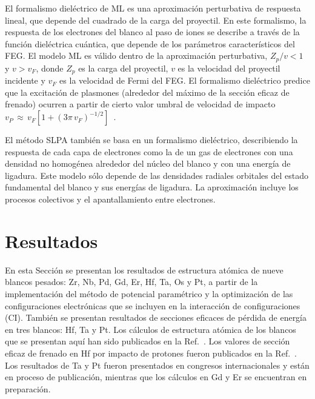 El formalismo dieléctrico de ML es una aproximación perturbativa de 
respuesta lineal, que depende del cuadrado de la carga del proyectil. En 
este formalismo, la respuesta de los electrones del blanco al paso de 
iones se describe a través de la función dieléctrica cuántica, que 
depende de los parámetros característicos del FEG. El modelo ML es 
válido dentro de la aproximación perturbativa, $Z_p/v<1$ y $v>v_F$, 
donde $Z_p$ es la carga del proyectil, $v$ es la velocidad del proyectil
incidente y $v_F$ es la velocidad de Fermi del FEG. El formalismo 
dieléctrico predice que la excitación de plasmones (alrededor del máximo 
de la sección eficaz de frenado) ocurren a partir de cierto valor umbral 
de velocidad de impacto 
$v_P\,\approx\,v_F[1+(3\pi\,v_F)^{-1/2}]$~\cite{suppression}. 

El método SLPA también se basa en un formalismo dieléctrico, 
describiendo la respuesta de cada capa de electrones como la de un gas 
de electrones con una densidad no homogénea alrededor del núcleo del 
blanco y con una energía de ligadura. Este modelo 
sólo depende de las densidades radiales orbitales del estado fundamental 
del blanco y sus energías de ligadura. La aproximación incluye los 
procesos colectivos y el apantallamiento entre electrones. 

\section{Resultados}
\label{sec:results-heavy}

En esta Sección se presentan los resultados de estructura atómica de 
nueve blancos pesados: Zr, Nb, Pd, Gd, Er, Hf, Ta, Os y Pt, a 
partir de la implementación del método de potencial paramétrico y la
optimización de las configuraciones electrónicas que se incluyen en la 
interacción de configuraciones (CI).
También se presentan resultados de secciones eficaces de pérdida de 
energía en tres blancos: Hf, Ta y Pt. Los cálculos de estructura atómica 
de los blancos que se presentan aquí han sido publicados en la 
Ref.~\cite{Mendez:19relat}. Los valores de sección eficaz de frenado en 
Hf por impacto de protones fueron publicados en la 
Ref.~\cite{Montanari:20}. Los resultados de Ta y Pt fueron presentados 
en congresos internacionales y están en proceso de publicación, mientras 
que los cálculos en Gd y Er se encuentran en preparación. 

